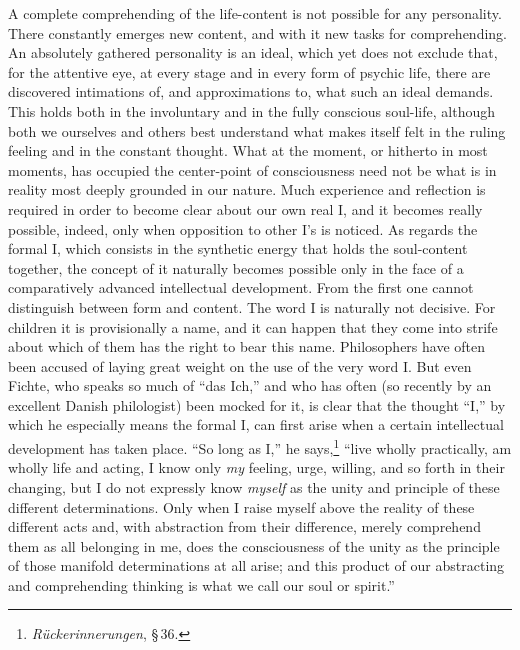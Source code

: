 \documentclass[12pt]{book}
\newcommand{\opage}[1]{\marginnote{\footnotesize\textit{[#1]}}}
\begin{document}
A complete comprehending of the life-content is not possible for any personality. There constantly
emerges new content, and with it new tasks for comprehending. An absolutely gathered personality is
an ideal, which yet does not exclude that, for the attentive eye, at every stage and in every form of
psychic life, there are discovered intimations of, and approximations to, what such an ideal demands.
This holds both in the involuntary and in the fully conscious soul-life, although both we ourselves
and others best understand what makes itself felt in the ruling feeling and in the constant thought.
What at the moment, or hitherto in most moments, has occupied the center-point of consciousness need
not be what is in reality most deeply grounded in our nature. Much experience and \opage{40}reflection is
required in order to become clear about our own real I, and it becomes really possible, indeed, only
when opposition to other I's is noticed. As regards the formal I, which consists in the synthetic
energy that holds the soul-content together, the concept of it naturally becomes possible only in the
face of a comparatively advanced intellectual development. From the first one cannot distinguish
between form and content. The word I is naturally not decisive. For children it is provisionally a
name, and it can happen that they come into strife about which of them has the right to bear this
name. Philosophers have often been accused of laying great weight on the use of the very word I. But
even Fichte, who speaks so much of ``das Ich,'' and who has often (so recently by an excellent Danish
philologist) been mocked for it, is clear that the thought ``I,'' by which he especially means the
formal I, can first arise when a certain intellectual development has taken place. ``So long as I,''
he says,\footnote{\textit{Rückerinnerungen}, \S\,36.} ``live wholly practically, am wholly life and
acting, I know only \textit{my} feeling, urge, willing, and so forth in their changing, but I do not expressly know \textit{myself} as the unity and principle of these different determinations. Only when I raise myself
above the reality of these different acts and, with abstraction from their difference, merely
comprehend them as all belonging in me, does the consciousness of the unity as the principle of those
manifold determinations at all arise; and this product of our abstracting and comprehending thinking
is what we call our soul or spirit.''
\end{document}
